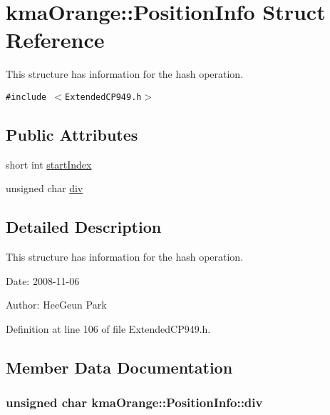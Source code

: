 \hypertarget{structkmaOrange_1_1PositionInfo}{
\section{kmaOrange::PositionInfo Struct Reference}
\label{structkmaOrange_1_1PositionInfo}
}
This structure has information for the hash operation.  


{\tt \#include $<$ExtendedCP949.h$>$}

\subsection*{Public Attributes}
\begin{CompactItemize}
\item 
short int \hyperlink{structkmaOrange_1_1PositionInfo_890ea41d70e77e218957b8365ce24550}{startIndex}
\item 
unsigned char \hyperlink{structkmaOrange_1_1PositionInfo_d7b4003f5ec35f39bee52eea68263105}{div}
\end{CompactItemize}


\subsection{Detailed Description}
This structure has information for the hash operation. 

\begin{Desc}
\item[Date:]2008-11-06 \end{Desc}
\begin{Desc}
\item[Author:]HeeGeun Park \end{Desc}


Definition at line 106 of file ExtendedCP949.h.

\subsection{Member Data Documentation}
\hypertarget{structkmaOrange_1_1PositionInfo_d7b4003f5ec35f39bee52eea68263105}{
\subsubsection[{div}]{\setlength{\rightskip}{0pt plus 5cm}unsigned char {\bf kmaOrange::PositionInfo::div}}}
\label{structkmaOrange_1_1PositionInfo_d7b4003f5ec35f39bee52eea68263105}




